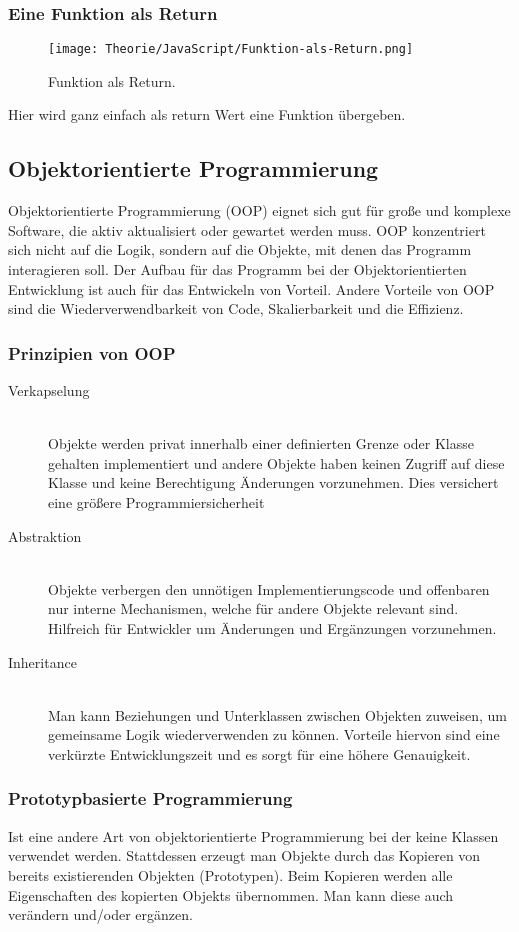 \begin{center}
    \subsubsection{Eine Funktion als Return}
\begin{figure}[htbp]
    \centerline{\texttt{[image: Theorie/JavaScript/Funktion-als-Return.png]}}
    \caption{Funktion als Return.~\cite{First-Class-Funktion}}
\end{figure}
\end{center}
Hier wird ganz einfach als return Wert eine Funktion übergeben.

\subsection{Objektorientierte Programmierung}
Objektorientierte Programmierung (OOP) eignet sich gut für große und komplexe Software, die aktiv aktualisiert oder gewartet werden muss. OOP konzentriert sich nicht auf die Logik, 
sondern auf die Objekte, mit denen das Programm interagieren soll. Der Aufbau für das Programm bei der Objektorientierten Entwicklung ist auch für das Entwickeln von Vorteil.
Andere Vorteile von OOP sind die Wiederverwendbarkeit von Code, Skalierbarkeit und die Effizienz.~\cite{OOP}

\subsubsection{Prinzipien von OOP}
\begin{description}
\item[Verkapselung]\hfill \\
 Objekte werden privat innerhalb einer definierten Grenze oder Klasse gehalten implementiert und andere Objekte haben keinen Zugriff auf diese Klasse und keine Berechtigung
 Änderungen vorzunehmen. Dies versichert eine größere Programmiersicherheit
\item[Abstraktion]\hfill \\
Objekte verbergen den unnötigen Implementierungscode und offenbaren nur interne Mechanismen, welche für andere Objekte relevant sind. Hilfreich für Entwickler um Änderungen 
und Ergänzungen vorzunehmen.
\item[Inheritance]\hfill \\
Man kann Beziehungen und Unterklassen zwischen Objekten zuweisen, um gemeinsame Logik wiederverwenden zu können. Vorteile hiervon sind eine verkürzte Entwicklungszeit und 
es sorgt für eine höhere Genauigkeit.
\end{description}

\subsubsection{Prototypbasierte Programmierung}
Ist eine andere Art von objektorientierte Programmierung bei der keine Klassen verwendet werden. Stattdessen erzeugt man Objekte durch das Kopieren von bereits existierenden 
Objekten (Prototypen). Beim Kopieren werden alle Eigenschaften des kopierten Objekts übernommen. Man kann diese auch verändern und/oder ergänzen.